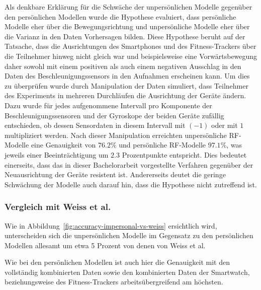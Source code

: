 Als denkbare Erklärung für die Schwäche der unpersönlichen Modelle gegenüber den persönlichen Modellen wurde die Hypothese evaluiert, dass persönliche Modelle eher über die Bewegungsrichtung und unpersönliche Modelle eher über die Varianz in den Daten Vorhersagen bilden. Diese Hypothese beruht auf der Tatsache, dass die Ausrichtungen des Smartphones und des Fitness-Trackers über die Teilnehmer hinweg nicht gleich war und beispielsweise eine Vorwärtsbewegung daher sowohl mit einem positiven als auch einem negativen Ausschlag in den Daten des Beschleunigungssensors in den Aufnahmen erscheinen kann. Um dies zu überprüfen wurde durch Manipulation der Daten simuliert, dass Teilnehmer des Experiments in mehreren Durchläufen die Ausrichtung der Geräte ändern. Dazu wurde für jedes aufgenommene Intervall pro Komponente der Beschleunigungssensoren und der Gyroskope der beiden Geräte zufällig entschieden, ob dessen Sensordaten in diesem Intervall mit $(-1)$ oder mit $1$ multipliziert werden. Nach dieser Manipulation erreichten unpersönliche RF-Modelle eine Genauigkeit von $76.2 \%$ und persönliche RF-Modelle $97.1 \%$, was jeweils einer Beeinträchtigung um $2.3$ Prozentpunkte entspricht. Dies bedeutet einerseits, dass das in dieser Bachelorarbeit vorgestellte Verfahren gegenüber der Neuausrichtung der Geräte resistent ist. Andererseits deutet die geringe Schwächung der Modelle auch darauf hin, dass die Hypothese nicht zutreffend ist.

\subsubsection{Vergleich mit Weiss et al.}

Wie in Abbildung~\ref{fig:accuracy-impersonal-vs-weiss} ersichtlich wird, unterscheiden sich die unpersönlichen Modelle im Gegensatz zu den persönlichen Modellen allesamt um etwa 5 Prozent von denen von Weiss et al.

Wie bei den persönlichen Modellen ist auch hier die Genauigkeit mit den vollständig kombinierten Daten sowie den kombinierten Daten der Smartwatch, beziehungsweise des Fitness-Trackers arbeitsübergreifend am höchsten.


